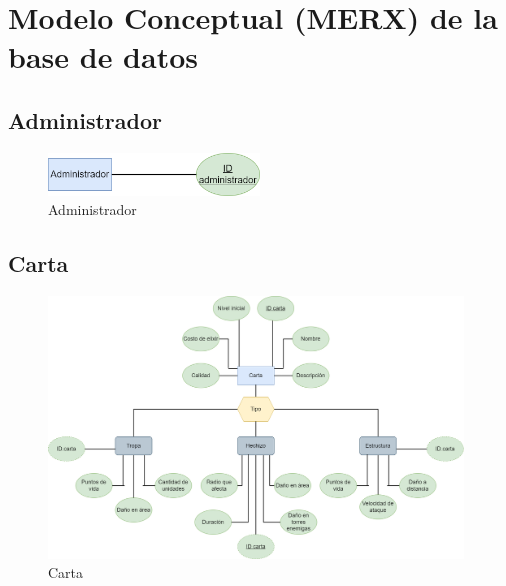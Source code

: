 %
%
%
%
\section{Modelo Conceptual (MERX) de la base de datos}

\subsection{Administrador}
\begin{figure}[H]
\centering
\includegraphics[width=0.5\textwidth]{../images/merx_administrator.png}
\caption{Administrador}
\end{figure}

\subsection{Carta}
\begin{figure}[H]
\centering
\includegraphics[width=0.98\textwidth]{../images/merx_card.png}
\caption{Carta}
\end{figure}

